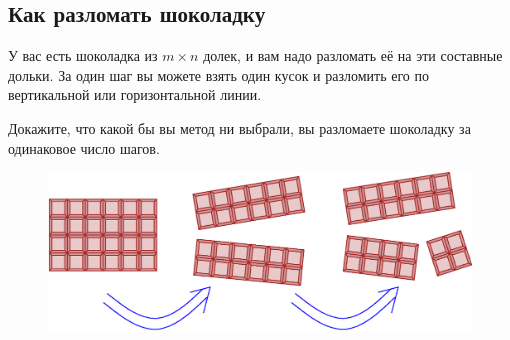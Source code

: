 \subsection*{Как разломать шоколадку}%

У вас есть шоколадка из $m\times n$ долек, и вам надо разломать её на эти составные дольки.
За один шаг вы можете взять один кусок и разломить его по вертикальной или горизонтальной линии.

Докажите, что какой бы вы метод ни выбрали, вы разломаете шоколадку за одинаковое число шагов.

\begin{figure}[h!]
\centering
\includegraphics[scale=0.5]{Figs/Algorithms/bar}
\end{figure}
